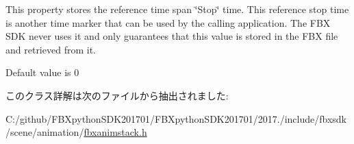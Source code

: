 This property stores the reference time span \char`\"{}\+Stop\char`\"{} time. This reference stop time is another time marker that can be used by the calling application. The F\+BX S\+DK never uses it and only guarantees that this value is stored in the F\+BX file and retrieved from it.

Default value is 0 

このクラス詳解は次のファイルから抽出されました\+:\begin{DoxyCompactItemize}
\item 
C\+:/github/\+F\+B\+Xpython\+S\+D\+K201701/\+F\+B\+Xpython\+S\+D\+K201701/2017./include/fbxsdk/scene/animation/\hyperlink{fbxanimstack_8h}{fbxanimstack.\+h}\end{DoxyCompactItemize}
